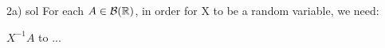 2a) sol
For each $ A \in \mathcal{B}(\mathbb{R}) $, in order for X to be a random variable, we need:

$ X^{-1}A $ to ...